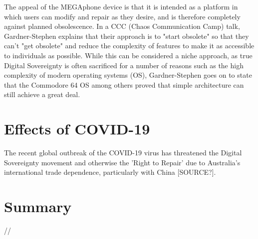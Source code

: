 The appeal of the MEGAphone device is that it is intended as a platform in which users can modify and repair as they desire, and is therefore completely against planned obsolescence.
In a CCC (Chaos Communication Camp) talk, Gardner-Stephen explains that their approach is to "start obsolete" so that they can't "get obsolete" and reduce the complexity of features to make it as accessible to individuals as possible\cite{mobilehistory}.
While this can be considered a niche approach, as true Digital Sovereignty is often sacrificed for a number of reasons such as the high complexity of modern operating systems (OS), Gardner-Stephen goes on to state that the Commodore 64 OS among others proved that simple architecture can still achieve a great deal.


\section{Effects of COVID-19}
The recent global outbreak of the COVID-19 virus has threatened the Digital Sovereignty movement and otherwise the 'Right to Repair' due to Australia's international trade dependence, particularly with China [SOURCE?].


\section{Summary}
//